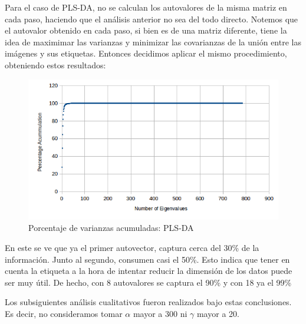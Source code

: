 Para el caso de PLS-DA, no se calculan los autovalores de la misma matriz en cada paso, haciendo que el an\'alisis anterior no sea del todo directo. Notemos que el autovalor obtenido en cada paso, si bien es de una matriz diferente, tiene la idea de maximimar las varianzas y minimizar las covarianzas de la uni\'on entre las im\'agenes y sus etiquetas. Entonces decidimos aplicar el mismo procedimiento, obteniendo estos resultados:

\newpage
\begin{figure}[h!]
  \begin{center}
	\includegraphics[scale=1]{exp4/PLSDA-percentage.png}
	\caption{Porcentaje de varianzas acumuladas: PLS-DA}
	\label{accum_var_PLSDA}
  \end{center}
\end{figure}

En este se ve que ya el primer autovector, captura cerca del 30\% de la informaci\'on. Junto al segundo, consumen casi el 50\%. Esto indica que tener en cuenta la etiqueta a la hora de intentar reducir la dimensi\'on de los datos puede ser muy \'util. De hecho, con 8 autovalores se captura el 90\% y con 18 ya el 99\%

Los subsiguientes an\'alisis cualitativos fueron realizados bajo estas conclusiones. Es decir, no consideramos tomar $\alpha$ mayor a 300 ni $\gamma$ mayor a 20.